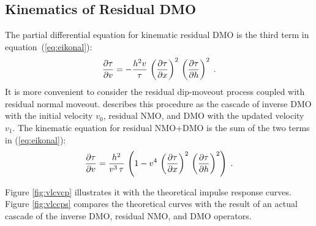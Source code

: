 \subsection{Kinematics of Residual DMO}   
The partial differential equation for kinematic residual DMO is the
third term in equation~(\ref{eq:eikonal}):
\begin{equation}
{{\partial \tau} \over {\partial v}} = 
- {{h^2 v} \over {\tau}}\,
\left({{\partial \tau} \over {\partial x}}\right)^2\,
\left({{\partial \tau} \over {\partial h}}\right)^2\;.
\label{eq:ResDMOeikonal} 
\end{equation}
It is more convenient to consider the residual dip-moveout process
coupled with residual normal moveout. \cite{Etgen.sepphd.68} describes
this procedure as the cascade of inverse DMO with the initial velocity
$v_0$, residual NMO, and DMO with the updated velocity $v_1$. The
kinematic equation for residual NMO+DMO is the sum of the two terms in
(\ref{eq:eikonal}):
\begin{equation}
{{\partial \tau} \over {\partial v}} = 
{{h^2} \over {v^3\,\tau}}\,\left(1-v^4\,
\left({{\partial \tau} \over {\partial x}}\right)^2\,
\left({{\partial \tau} \over {\partial h}}\right)^2\right)\;.
\label{eq:DMONMOeikonal} 
\end{equation}
\begin{comment}
If the boundary data for equation (\ref{eq:DMONMOeikonal}) are on a
common-offset gather, it is appropriate to rewrite this equation
purely in terms of the midpoint derivative ${{\partial \tau} \over
{\partial x}}$, eliminating the offset-derivative term ${{\partial
\tau} \over {\partial h}}$. The resultant expression, derived in
Appendix A, has the form
\begin{equation}
v^3\,{{\partial \tau} \over {\partial v}} = 
{{2\,h^2} \over
{\sqrt{\tau^2 + 4\,h^2\,
Q\left(v,{{\partial \tau} \over {\partial x}}\right)} + \tau}}\;,
\label{eq:noth} 
\end{equation}
where 
\begin{equation}
Q(v,\tau_x) = {{\tau_x^2} \over 
{\left(1 + v^2\,\tau_x^2\right)^2}}\;.   
\label{eq:qtx} 
\end{equation}
\end{comment}

  Figure \ref{fig:vlcvcp} illustrates it with the
theoretical impulse response curves. Figure \ref{fig:vlccps} compares the
theoretical curves with the result of an actual cascade of the inverse
DMO, residual NMO, and DMO operators.

